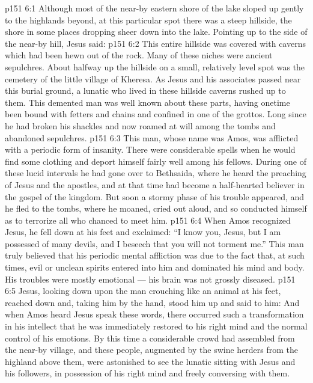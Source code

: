 \vs p151 6:1 Although most of the near\hyp{}by eastern shore of the lake sloped up gently to the highlands beyond, at this particular spot there was a steep hillside, the shore in some places dropping sheer down into the lake. Pointing up to the side of the near\hyp{}by hill, Jesus said: 
\vs p151 6:2 This entire hillside was covered with caverns which had been hewn out of the rock. Many of these niches were ancient sepulchres. About halfway up the hillside on a small, relatively level spot was the cemetery of the little village of Kheresa. As Jesus and his associates passed near this burial ground, a lunatic who lived in these hillside caverns rushed up to them. This demented man was well known about these parts, having onetime been bound with fetters and chains and confined in one of the grottos. Long since he had broken his shackles and now roamed at will among the tombs and abandoned sepulchres.
\vs p151 6:3 This man, whose name was Amos, was afflicted with a periodic form of insanity. There were considerable spells when he would find some clothing and deport himself fairly well among his fellows. During one of these lucid intervals he had gone over to Bethsaida, where he heard the preaching of Jesus and the apostles, and at that time had become a half\hyp{}hearted believer in the gospel of the kingdom. But soon a stormy phase of his trouble appeared, and he fled to the tombs, where he moaned, cried out aloud, and so conducted himself as to terrorize all who chanced to meet him.
\vs p151 6:4 When Amos recognized Jesus, he fell down at his feet and exclaimed: “I know you, Jesus, but I am possessed of many devils, and I beseech that you will not torment me.” This man truly believed that his periodic mental affliction was due to the fact that, at such times, evil or unclean spirits entered into him and dominated his mind and body. His troubles were mostly emotional --- his brain was not grossly diseased.
\vs p151 6:5 Jesus, looking down upon the man crouching like an animal at his feet, reached down and, taking him by the hand, stood him up and said to him:  And when Amos heard Jesus speak these words, there occurred such a transformation in his intellect that he was immediately restored to his right mind and the normal control of his emotions. By this time a considerable crowd had assembled from the near\hyp{}by village, and these people, augmented by the swine herders from the highland above them, were astonished to see the lunatic sitting with Jesus and his followers, in possession of his right mind and freely conversing with them.
